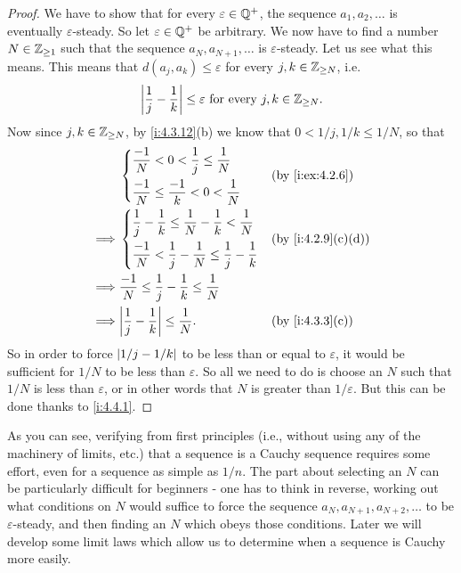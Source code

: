 \begin{proof}
  We have to show that for every \(\varepsilon \in \mathbb{Q}^+\), the sequence \(a_1, a_2, \dots\) is eventually \(\varepsilon\)-steady.
  So let \(\varepsilon \in \mathbb{Q}^+\) be arbitrary.
  We now have to find a number \(N \in \mathbb{Z}_{\geq 1}\) such that the sequence \(a_N, a_{N + 1}, \dots\) is \(\varepsilon\)-steady.
  Let us see what this means.
  This means that \(d(a_j, a_k) \leq \varepsilon\) for every \(j, k \in \mathbb{Z}_{\geq N}\), i.e.
  \[
    \left\lvert\dfrac{1}{j} - \dfrac{1}{k}\right\rvert \leq \varepsilon \text{ for every } j, k \in \mathbb{Z}_{\geq N}.
  \]
  Now since \(j, k \in \mathbb{Z}_{\geq N}\), by \cref{i:4.3.12}(b) we know that \(0 < 1 / j, 1 / k \leq 1 / N\), so that
  \begin{align*}
             & \begin{dcases}
                 \dfrac{-1}{N} < 0 < \dfrac{1}{j} \leq \dfrac{1}{N}  \\
                 \dfrac{-1}{N} \leq \dfrac{-1}{k} < 0 < \dfrac{1}{N} \\
               \end{dcases}                         &  & \by{i:ex:4.2.6}                                           \\
    \implies & \begin{dcases}
                 \dfrac{1}{j} - \dfrac{1}{k} \leq \dfrac{1}{N} - \dfrac{1}{k} < \dfrac{1}{N} \\
                 \dfrac{-1}{N} < \dfrac{1}{j} - \dfrac{1}{N} \leq \dfrac{1}{j} - \dfrac{1}{k}
               \end{dcases} &  & \by{i:4.2.9}[c,d]                         \\
    \implies & \dfrac{-1}{N} \leq \dfrac{1}{j} - \dfrac{1}{k} \leq \dfrac{1}{N}                                    \\
    \implies & \abs{\dfrac{1}{j} - \dfrac{1}{k}} \leq \dfrac{1}{N}.                           &  & \by{i:4.3.3}[c]
  \end{align*}
  So in order to force \(\left\lvert1 / j - 1 / k\right\rvert\) to be less than or equal to \(\varepsilon\), it would be sufficient for \(1 / N\) to be less than \(\varepsilon\).
  So all we need to do is choose an \(N\) such that \(1 / N\) is less than \(\varepsilon\), or in other words that \(N\) is greater than \(1 / \varepsilon\).
  But this can be done thanks to \cref{i:4.4.1}.
\end{proof}

\begin{note}
  As you can see, verifying from first principles (i.e., without using any of the machinery of limits, etc.) that a sequence is a Cauchy sequence requires some effort, even for a sequence as simple as \(1 / n\).
  The part about selecting an \(N\) can be particularly difficult for beginners
  - one has to think in reverse, working out what conditions on \(N\) would suffice to force the sequence \(a_N, a_{N + 1}, a_{N + 2}, \dots\) to be \(\varepsilon\)-steady, and then finding an \(N\) which obeys those conditions.
  Later we will develop some limit laws which allow us to determine when a sequence is Cauchy more easily.
\end{note}

